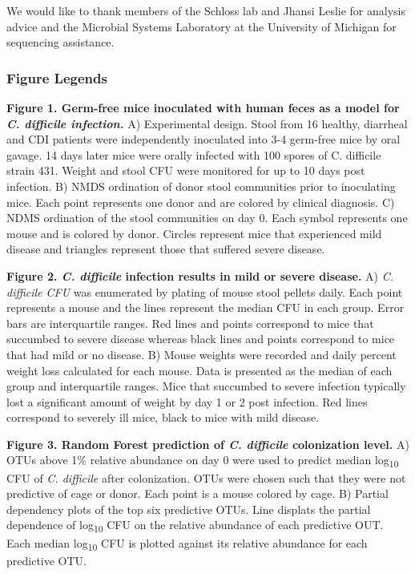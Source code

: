 \documentclass[11pt,]{article}
\begin{document}
We would like to thank members of the Schloss lab and Jhansi Leslie for
analysis advice and the Microbial Systems Laboratory at the University
of Michigan for sequencing assistance.

\newpage

\subsubsection{Figure Legends}\label{figure-legends}

\textbf{Figure 1. Germ-free mice inoculated with human feces as a model
for \emph{C. difficile infection.}} A) Experimental design. Stool from
16 healthy, diarrheal and CDI patients were independently inoculated
into 3-4 germ-free mice by oral gavage. 14 days later mice were orally
infected with 100 spores of C. difficile strain 431. Weight and stool
CFU were monitored for up to 10 days post infection. B) NMDS ordination
of donor stool communities prior to inoculating mice. Each point
represents one donor and are colored by clinical diagnosis. C) NDMS
ordination of the stool communities on day 0. Each symbol represents one
mouse and is colored by donor. Circles represent mice that experienced
mild disease and triangles represent those that suffered severe disease.

\textbf{Figure 2. \emph{C. difficile} infection results in mild or
severe disease.} A) \emph{C. difficile CFU} was enumerated by plating of
mouse stool pellets daily. Each point represents a mouse and the lines
represent the median CFU in each group. Error bars are interquartile
ranges. Red lines and points correspond to mice that succumbed to severe
disease whereas black lines and points correspond to mice that had mild
or no disease. B) Mouse weights were recorded and daily percent weight
loss calculated for each mouse. Data is presented as the median of each
group and interquartile ranges. Mice that succumbed to severe infection
typically lost a significant amount of weight by day 1 or 2 post
infection. Red lines correspond to severely ill mice, black to mice with
mild disease.

\textbf{Figure 3. Random Forest prediction of \emph{C. difficile}
colonization level.} A) OTUs above 1\% relative abundance on day 0 were
used to predict median log\textsubscript{10} CFU of \emph{C. difficile}
after colonization. OTUs were chosen such that they were not predictive
of cage or donor. Each point is a mouse colored by cage. B) Partial
dependency plots of the top six predictive OTUs. Line displats the
partial dependence of log\textsubscript{10} CFU on the relative
abundance of each predictive OUT. Each median log\textsubscript{10} CFU
is plotted against its relative abundance for each predictive OTU.
\end{document}
